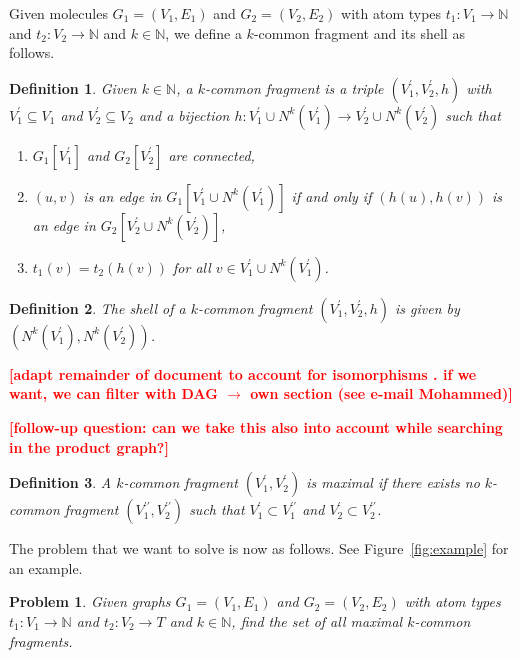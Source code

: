 \documentclass[11pt]{article}
\newcommand{\todo}[1]{\xspace{\bfseries\sffamily\textcolor{red}{[#1]}}\xspace}
\newtheorem{problem}{Problem}[section]
\newtheorem{definition}{Definition}[section]
\begin{document}
Given molecules $G_1 = (V_1, E_1)$ and $G_2 = (V_2, E_2)$ with atom types $t_1 :
V_1 \rightarrow \mathbb{N}$ and $t_2 : V_2 \rightarrow \mathbb{N}$ and $k \in
\mathbb{N}$, we define a $k$-common fragment and its shell as follows.

\begin{definition}
Given $k \in \mathbb{N}$, a \emph{$k$-common fragment} is a triple $(V^\prime_1,
V^\prime_2,h)$ with $V^\prime_1 \subseteq V_1$ and $V^\prime_2 \subseteq V_2$ and a bijection $h : V^\prime_1 \cup N^k(V^\prime_1) \rightarrow V^\prime_2
\cup N^k(V^\prime_2)$ such that
\begin{enumerate}
  \item[(i)] $G_1[V^\prime_1]$ and $G_2[V^\prime_2]$ are connected,
  \item[(ii)] $(u,v)$ is an edge in $G_1[V^\prime_1 \cup N^k(V^\prime_1)]$ if and
    only if $(h(u),h(v))$ is an edge in ${G_2[V^\prime_2 \cup
    N^k(V^\prime_2)]}$,
  \item[(iii)] $t_1(v) = t_2(h(v))$ for all $v \in V^\prime_1 \cup
    N^k(V^\prime_1)$.
\end{enumerate}
\end{definition}

\begin{definition}
The \emph{shell} of a $k$-common fragment $(V^\prime_1, V^\prime_2, h)$ is given by
$(N^k(V^\prime_1), N^k(V^\prime_2))$.
\end{definition}

\todo{adapt remainder of document to account for isomorphisms . if we
  want, we can filter with DAG $\to$ own section (see e-mail Mohammed)}

\todo{follow-up question: can we take this also into account while
  searching in the product graph?}

\begin{definition}
A $k$-common fragment $(V^\prime_1,V^\prime_2)$ is \emph{maximal} if there
exists no $k$-common fragment $(V^{\prime\prime}_1,V^{\prime\prime}_2)$ such
that $V^\prime_1 \subset V^{\prime\prime}_1$ and $V^\prime_2 \subset
V^{\prime\prime}_2$.
\end{definition}

The problem that we want to solve is now as follows. See
Figure~\ref{fig:example} for an example.

\begin{problem}
Given graphs $G_1 = (V_1, E_1)$ and $G_2 = (V_2, E_2)$ with atom types $t_1 :
V_1 \rightarrow \mathbb{N}$ and $t_2 : V_2 \rightarrow T$ and $k \in
\mathbb{N}$, find the set of all maximal $k$-common fragments.
\end{problem}
\end{document}
